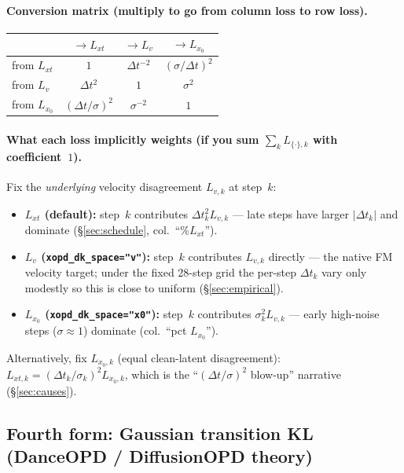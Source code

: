 \documentclass[11pt,a4paper]{article}
\newcommand{\dt}{\Delta t}
\begin{document}
\paragraph{Conversion matrix (multiply to go from column loss to row loss).}
\begin{center}
\footnotesize
\renewcommand{\arraystretch}{1.3}
\begin{tabular}{@{}l|ccc@{}}
 & $\to L_{xt}$ & $\to L_v$ & $\to L_{x_0}$ \\
\midrule
from $L_{xt}$ & $1$ & $\dt^{-2}$ & $(\sigma/\dt)^2$ \\
from $L_v$ & $\dt^2$ & $1$ & $\sigma^2$ \\
from $L_{x_0}$ & $(\dt/\sigma)^2$ & $\sigma^{-2}$ & $1$ \\
\end{tabular}
\end{center}

\paragraph{What each loss implicitly weights (if you sum $\sum_k L_{\{\cdot\},k}$ with coefficient~$1$).}
Fix the \emph{underlying} velocity disagreement $L_{v,k}$ at step~$k$:
\begin{itemize}[leftmargin=1.5em]
\item \textbf{$L_{xt}$ (default):} step~$k$ contributes $\dt_k^2 L_{v,k}$ --- late steps have larger
$\lvert\dt_k\rvert$ and dominate (\S\ref{sec:schedule}, col.~``\%$L_{xt}$'').
\item \textbf{$L_v$ (\texttt{xopd\_dk\_space="v"}):} step~$k$ contributes $L_{v,k}$ directly --- the
native FM velocity target; under the fixed 28-step grid the per-step $\dt_k$ vary only modestly so
this is close to uniform (\S\ref{sec:empirical}).
\item \textbf{$L_{x_0}$ (\texttt{xopd\_dk\_space="x0"}):} step~$k$ contributes $\sigma_k^2 L_{v,k}$ ---
early high-noise steps ($\sigma\approx1$) dominate (col.~``pct $L_{x_0}$'').
\end{itemize}
Alternatively, fix $L_{x_0,k}$ (equal clean-latent disagreement): $L_{xt,k}=(\dt_k/\sigma_k)^2
L_{x_0,k}$, which is the ``$(\dt/\sigma)^2$ blow-up'' narrative (\S\ref{sec:causes}).

\subsection{Fourth form: Gaussian transition KL (DanceOPD / DiffusionOPD theory)}
\label{ssec:danceopd-kl}
\end{document}
